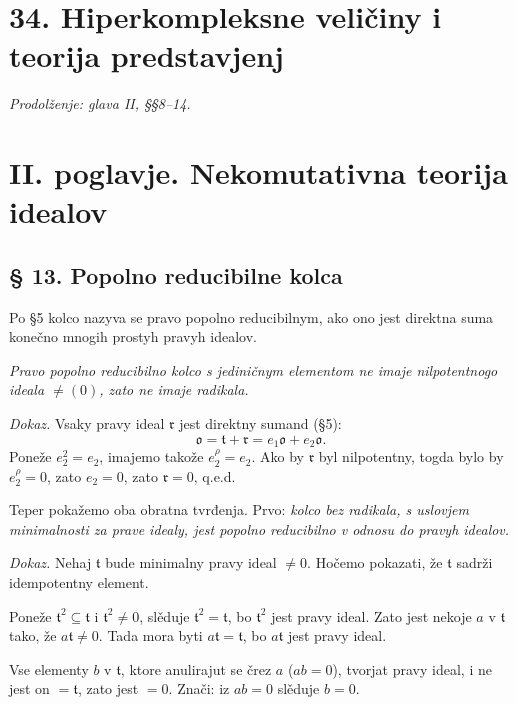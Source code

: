 \documentclass[11pt]{article}
\providecommand{\mo}{\mathfrak{o}}
\providecommand{\mr}{\mathfrak{r}}
\providecommand{\mt}{\mathfrak{t}}
\begin{document}
\section*{34. Hiperkompleksne veličiny i teorija predstavjenj}
\emph{Prodolženje: glava II, §§8--14.}

\section*{II. poglavje. Nekomutativna teorija idealov}

\subsection*{§ 13. Popolno reducibilne kolca}

Po §5 kolco nazyva se pravo popolno reducibilnym, ako ono jest direktna suma konečno mnogih prostyh pravyh idealov.

\emph{Pravo popolno reducibilno kolco s jediničnym elementom ne imaje nilpotentnogo ideala $\ne(0)$, zato ne imaje radikala.}

\emph{Dokaz.} Vsaky pravy ideal $\mr$ jest direktny sumand (§5):
\[
        \mo=\mt+\mr=e_1\mo+e_2\mo.
\]
Poneže $e_2^2=e_2$, imajemo takože $e_2^\rho=e_2$. Ako by $\mr$ byl nilpotentny, togda bylo by $e_2^\rho=0$, zato $e_2=0$, zato $\mr=0$, q.e.d.

Teper pokažemo oba obratna tvrđenja. Prvo: \emph{kolco bez radikala, s uslovjem minimalnosti za prave idealy, jest popolno reducibilno v odnosu do pravyh idealov.}

\emph{Dokaz.} Nehaj $\mt$ bude minimalny pravy ideal $\ne0$. Hočemo pokazati, že $\mt$ sadrži idempotentny element.

Poneže $\mt^2\subseteq\mt$ i $\mt^2\ne0$, slěduje $\mt^2=\mt$, bo $\mt^2$ jest pravy ideal. Zato jest nekoje $a$ v $\mt$ tako, že $a\mt\ne0$. Tada mora byti $a\mt=\mt$, bo $a\mt$ jest pravy ideal.

Vse elementy $b$ v $\mt$, ktore anulirajut se črez $a$ ($ab=0$), tvorjat pravy ideal, i ne jest on $=\mt$, zato jest $=0$. Znači: iz $ab=0$ slěduje $b=0$.
\end{document}
